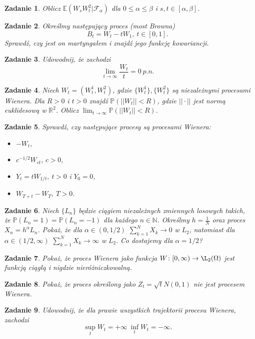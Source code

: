 \documentclass[12pt]{article}
\newtheorem{zd}{Zadanie}
\begin{document}
\begin{zd}
	Oblicz $\mathbb{E}\left(W_sW_t^2|\mathcal{F}_{\alpha}\right)$ dla $0\leq \alpha\leq \beta$ i $s,t \in [\alpha, \beta]$.
\end{zd}
\begin{zd}
	Określmy następujący proces (most Browna)
	\begin{displaymath}
		B_t = W_t - tW_1, \ t\in[0,1].
	\end{displaymath}
	Sprawdź, czy jest on martyngałem i znajdź jego funkcję kowariancji.
\end{zd}
\begin{zd}
	Udowodnij, że zachodzi 
	\begin{displaymath}
	\lim_{t \to \infty}\frac{W_t}{t} = 0\ p.n.
	\end{displaymath}
\end{zd}
\begin{zd}
	Niech $W_t = (W_t^1, W_t^2)$, gdzie $\{W_t^1\}, \{W_t^2\}$ są niezależnymi procesami Wienera. Dla $R > 0$ i $t > 0$ znajdź $\mathbb{P}\left(||W_t|| < R	\right)$, gdzie $||\cdot||$ jest normą euklidesową w $\mathbb{R}^2$. Oblicz $\lim_{t \to \infty}\mathbb{P}\left(||W_t|| < R	\right)$.
\end{zd}
\begin{zd}
	Sprawdź, czy następujące procesy są procesami Wienera:
	\begin{itemize}
		\item $-W_t$,
		\item $c^{-1/2}W_{ct}$, $c>0$,
		\item $Y_t = tW_{1/t},\ t> 0$ i $Y_0 = 0$,
		\item $W_{T+t} - W_T, \ T > 0$.
	\end{itemize}
\end{zd}
\begin{zd}
	Niech $\{L_n\}$ będzie ciągiem niezależnych zmiennych losowych takich, że $\mathbb{P}\left(L_n = 1\right) = \mathbb{P}\left(L_n = -1\right)$ dla każdego $n\in\mathbb{N}$. Określmy $h = \frac{1}{N}$ oraz proces $X_n = h^{\alpha}L_n$. Pokaż, że dla $\alpha \in (0,1/2)$ $\sum_{k=1}^NX_k \to 0$ w $L_2$, natomiast dla $\alpha \in (1/2, \infty)$ $\sum_{k=1}^NX_k \to \infty$ w $L_2$. Co dostajemy dla $\alpha = 1/2$?
\end{zd}
\begin{zd}
	Pokaż, że proces Wienera jako funkcja $W\colon [0,\infty) \to \L_2(\Omega)$ jest funkcją ciągłą i nigdzie nieróżniczkowalną.
\end{zd}
\begin{zd}
	Pokaż, że proces określony jako $Z_t = \sqrt{t}N(0,1)$ nie jest procesem Wienera.
\end{zd}
\begin{zd}
	Udowodnij, że dla prawie wszystkich trajektorii procesu Wienera, zachodzi
	\begin{displaymath}
		\sup_tW_t = +\infty\ \inf_tW_t = -\infty.
	\end{displaymath}
\end{zd}
\end{document}
